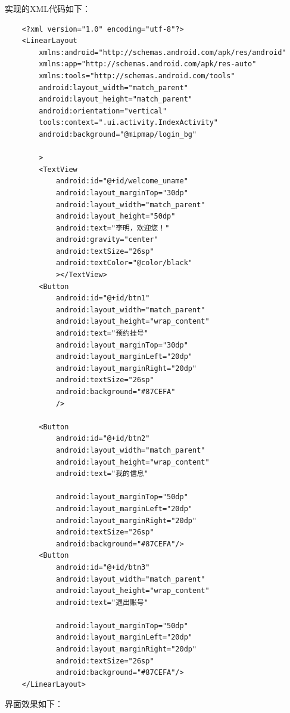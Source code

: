 \documentclass[UTF8,12pt]{article}
\begin{document}
实现的XML代码如下：

\begin{lstlisting}
    <?xml version="1.0" encoding="utf-8"?>
    <LinearLayout
        xmlns:android="http://schemas.android.com/apk/res/android"
        xmlns:app="http://schemas.android.com/apk/res-auto"
        xmlns:tools="http://schemas.android.com/tools"
        android:layout_width="match_parent"
        android:layout_height="match_parent"
        android:orientation="vertical"
        tools:context=".ui.activity.IndexActivity"
        android:background="@mipmap/login_bg"
    
        >
        <TextView
            android:id="@+id/welcome_uname"
            android:layout_marginTop="30dp"
            android:layout_width="match_parent"
            android:layout_height="50dp"
            android:text="李明，欢迎您！"
            android:gravity="center"
            android:textSize="26sp"
            android:textColor="@color/black"
            ></TextView>
        <Button
            android:id="@+id/btn1"
            android:layout_width="match_parent"
            android:layout_height="wrap_content"
            android:text="预约挂号"
            android:layout_marginTop="30dp"
            android:layout_marginLeft="20dp"
            android:layout_marginRight="20dp"
            android:textSize="26sp"
            android:background="#87CEFA"
            />
    
        <Button
            android:id="@+id/btn2"
            android:layout_width="match_parent"
            android:layout_height="wrap_content"
            android:text="我的信息"
    
            android:layout_marginTop="50dp"
            android:layout_marginLeft="20dp"
            android:layout_marginRight="20dp"
            android:textSize="26sp"
            android:background="#87CEFA"/>
        <Button
            android:id="@+id/btn3"
            android:layout_width="match_parent"
            android:layout_height="wrap_content"
            android:text="退出账号"
    
            android:layout_marginTop="50dp"
            android:layout_marginLeft="20dp"
            android:layout_marginRight="20dp"
            android:textSize="26sp"
            android:background="#87CEFA"/>
    </LinearLayout>
\end{lstlisting}

界面效果如下：

\newpage
\end{document}
